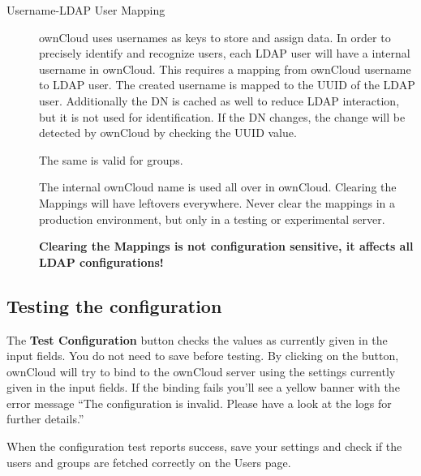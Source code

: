 \documentclass[letterpaper,10pt,english]{sphinxmanual}
\begin{document}
\begin{description}
\begin{itemize}
\end{itemize}

\item[{Username-LDAP User Mapping}] \leavevmode
ownCloud uses usernames as keys to store and assign data. In order to
precisely identify and recognize users, each LDAP user will have a internal
username in ownCloud. This requires a mapping from ownCloud username to LDAP
user. The created username is mapped to the UUID of the LDAP user.
Additionally the DN is cached as well to reduce LDAP interaction, but it is
not used for identification. If the DN changes, the change will be detected by
ownCloud by checking the UUID value.

The same is valid for groups.

The internal ownCloud name is used all over in ownCloud. Clearing the Mappings
will have leftovers everywhere. Never clear the mappings in a production
environment, but only in a testing or experimental server.

\textbf{Clearing the Mappings is not configuration sensitive, it affects all LDAP
configurations!}

\end{description}


\subsection{Testing the configuration}
\label{configuration_user/user_auth_ldap:testing-the-configuration}
The \textbf{Test Configuration} button checks the values as currently given in the
input fields. You do not need to save before testing. By clicking on the
button, ownCloud will try to bind to the ownCloud server using the
settings currently given in the input fields. If the binding fails you'll see a
yellow banner with the error message ``The configuration is invalid. Please have
a look at the logs for further details.''

When the configuration test reports success, save your settings and check if the
users and groups are fetched correctly on the Users page.
\end{document}
